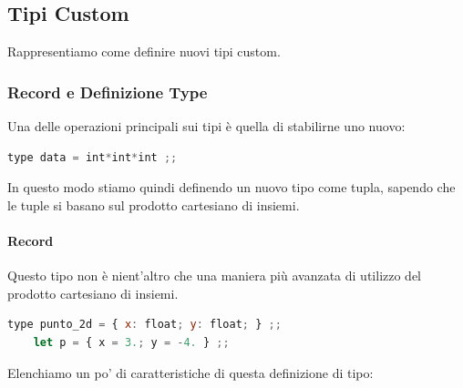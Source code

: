 \documentclass{article}
\begin{document}
\vspace*{-20px}

\newpage

\subsection{Tipi Custom}

Rappresentiamo come definire nuovi tipi custom.

\subsubsection{Record e Definizione Type}

Una delle operazioni principali sui tipi è quella di stabilirne uno nuovo:

\vspace*{10px}
\begin{lstlisting}[language = JavaScript]
    type data = int*int*int ;;
\end{lstlisting}

\vspace*{-20px}

In questo modo stiamo quindi definendo un nuovo tipo come tupla, sapendo che le tuple si basano sul prodotto cartesiano di insiemi.

\vspace*{15px}

\paragraph{Record} Questo tipo non è nient'altro che una maniera più avanzata di utilizzo del prodotto cartesiano di insiemi.

\vspace*{10px}
\begin{lstlisting}[language = JavaScript]
    type punto_2d = { x: float; y: float; } ;;
    let p = { x = 3.; y = -4. } ;;
\end{lstlisting}

\vspace*{-20px}

Elenchiamo un po' di caratteristiche di questa definizione di tipo:
\end{document}
